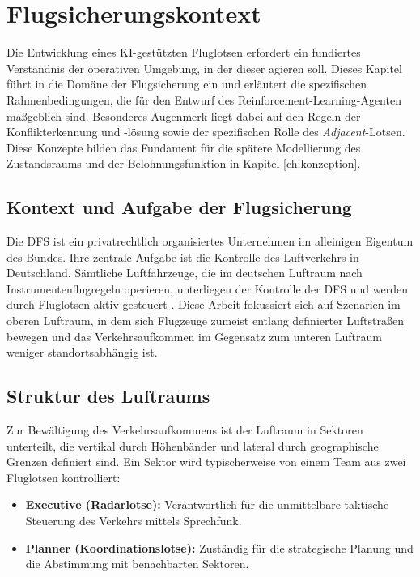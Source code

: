 \chapter{Flugsicherungskontext}
\label{ch:fs_grundlagen}

Die Entwicklung eines \ac{KI}-gestützten Fluglotsen erfordert ein fundiertes Verständnis der operativen Umgebung, in der dieser agieren soll. Dieses Kapitel führt in die Domäne der Flugsicherung ein und erläutert die spezifischen Rahmenbedingungen, die für den Entwurf des Reinforcement-Learning-Agenten maßgeblich sind. Besonderes Augenmerk liegt dabei auf den Regeln der Konflikterkennung und -lösung sowie der spezifischen Rolle des \textit{Adjacent}-Lotsen. Diese Konzepte bilden das Fundament für die spätere Modellierung des Zustandsraums und der Belohnungsfunktion in Kapitel \ref{ch:konzeption}.

\section{Kontext und Aufgabe der Flugsicherung}
Die \ac{DFS} ist ein privatrechtlich organisiertes Unternehmen im alleinigen Eigentum des Bundes.
Ihre zentrale Aufgabe ist die Kontrolle des Luftverkehrs in Deutschland.
Sämtliche Luftfahrzeuge, die im deutschen Luftraum nach Instrumentenflugregeln operieren, unterliegen der Kontrolle der \ac{DFS} und werden durch Fluglotsen aktiv gesteuert \cite{dfs_flugsicherung}.
Diese Arbeit fokussiert sich auf Szenarien im oberen Luftraum, in dem sich Flugzeuge zumeist entlang definierter Luftstraßen bewegen und das Verkehrsaufkommen im Gegensatz zum unteren Luftraum weniger standortsabhängig ist.

\section{Struktur des Luftraums}
Zur Bewältigung des Verkehrsaufkommens ist der Luftraum in Sektoren unterteilt, die vertikal durch Höhenbänder und lateral durch geographische Grenzen definiert sind.
Ein Sektor wird typischerweise von einem Team aus zwei Fluglotsen kontrolliert:
\begin{itemize}
    \item \textbf{Executive (Radarlotse):} Verantwortlich für die unmittelbare taktische Steuerung des Verkehrs mittels Sprechfunk.
    \item \textbf{Planner (Koordinationslotse):} Zuständig für die strategische Planung und die Abstimmung mit benachbarten Sektoren.
\end{itemize}

